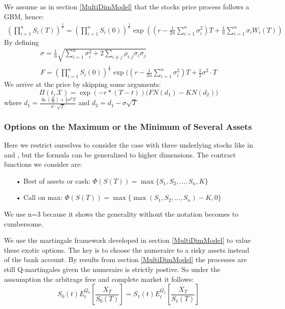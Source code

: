 We assume as in section \ref{MultiDimModel} that the stocks price process follows a GBM, hence:
\begin{equation}
\begin{split}
(\prod_{i=1}^{n} S_i(T))^{\frac{1}{n}} = (\prod_{i=1}^{n} S_i(0))^{\frac{1}{n}} \exp((r-\frac{1}{2n}\sum_{i=1}^{n}\sigma_i^2)T + \frac{1}{n} \sum_{i=1}^{n} \sigma_i W_i(T))
\end{split}
\end{equation}
By defining
\begin{align}
\sigma = \frac{1}{n} \sqrt{\sum_{i=1}^{n} \sigma_i^2 + 2 \sum_{i\neq j} \rho_{i,j}\sigma_i \sigma_j}\\
F=(\prod_{i=1}^{n} S_i(0))^{\frac{1}{n}} \exp((r-\frac{1}{2n}\sum_{i=1}^{n}\sigma_i^2)T + \frac{1}{2} \sigma^2 \cdot T
\end{align}
We arrive at the price by skipping some arguments:
\begin{equation}
\Pi(t,\mathcal{X})=\exp(-r*(T-t))\bigg(F N(d_1) - K N(d_2) \bigg)
\end{equation}
where $d_1=\frac{\ln(\frac{F}{K}) + \frac{1}{2} \sigma^2 T}{\sigma \cdot \sqrt{T}}$ and $d_2=d_1-\sigma \sqrt{T}$

\subsubsection{Options on the Maximum or the Minimum of Several Assets}
Here we restrict ourselves to consider the case with three underlying stocks like in \parencite{BEG} and \parencite{Ouwehand2006}, but the formula can be generalized to higher dimensions. The contract functions we consider are:
\begin{enumerate}
\item[•] Best of assets or cash: $\Phi(S(T))=\max\{S_1,S_2,\ldots,S_n,K\}$
\item[•] Call on max: $\Phi(S(T))=\max\{\max(S_1,S_2,\ldots,S_n)-K,0\}$
\end{enumerate}
We use n=3 because it shows the generality without the notation becomes to cumbersome.

We use the martingale framework developed in section \ref{MultiDimModel} to value these exotic options. The key is to choose the numeraire to a risky assets instead of the bank account. By results from section \ref{MultiDimModel} the processes are still Q-martingales given the numeraire is strictly postive. So under the asssumption the arbitrage free and complete market it follows:
$$S_0(t)E^{Q_0}_t[\frac{X_T}{S_0(T)}]=S_1(t)E^{Q_1}_t[\frac{X_T}{S_1(T)}]$$

